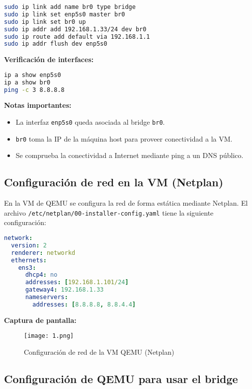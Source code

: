 \documentclass[12pt, a4paper]{article}
\begin{document}
\begin{lstlisting}[language=bash, caption=Creación del bridge br0]
sudo ip link add name br0 type bridge
sudo ip link set enp5s0 master br0
sudo ip link set br0 up
sudo ip addr add 192.168.1.33/24 dev br0
sudo ip route add default via 192.168.1.1
sudo ip addr flush dev enp5s0
\end{lstlisting}

\textbf{Verificación de interfaces:}

\begin{lstlisting}[language=bash, caption=Verificación de interfaces]
ip a show enp5s0
ip a show br0
ping -c 3 8.8.8.8
\end{lstlisting}

\textbf{Notas importantes:}
\begin{itemize}
    \item La interfaz \texttt{enp5s0} queda asociada al bridge \texttt{br0}.
    \item \texttt{br0} toma la IP de la máquina host para proveer conectividad a la VM.
    \item Se comprueba la conectividad a Internet mediante ping a un DNS público.
\end{itemize}

\subsection{Configuración de red en la VM (Netplan)}

En la VM de QEMU se configura la red de forma estática mediante Netplan. El archivo \texttt{/etc/netplan/00-installer-config.yaml} tiene la siguiente configuración:

\begin{lstlisting}[language=yaml, caption=Archivo de Netplan de la VM QEMU]
network:
  version: 2
  renderer: networkd
  ethernets:
    ens3:
      dhcp4: no
      addresses: [192.168.1.101/24]
      gateway4: 192.168.1.33
      nameservers:
        addresses: [8.8.8.8, 8.8.4.4]
\end{lstlisting}

\textbf{Captura de pantalla:}  

\begin{figure}[H]
    \centering
    \texttt{[image: 1.png]}
    \caption{Configuración de red de la VM QEMU (Netplan)}
    \label{fig:netplan_vm}
\end{figure}


\subsection{Configuración de QEMU para usar el bridge}
\end{document}
